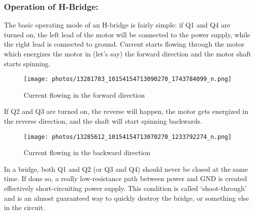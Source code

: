 \subsubsection*{Operation of H-Bridge:}
The basic operating mode of an H-bridge is fairly simple: if Q1 and Q4 are turned on, the left lead of the motor will be connected to the power supply, while the right lead is connected to ground. Current starts flowing through the motor which energizes the motor in (let’s say) the forward direction and the motor shaft starts spinning.
\begin{figure}[h]
\center
\texttt{[image: photos/13281783\_10154154713090270\_1743784099\_n.png]} 
\caption{Current flowing in the forward direction}
\end{figure}
\justify
If Q2 and Q3 are turned on, the reverse will happen, the motor gets energized in the reverse direction, and the shaft will start spinning backwards.\\
\newpage
\begin{figure}[h]
\center
\texttt{[image: photos/13285612\_10154154713070270\_1233792274\_n.png]} 
\caption{Current flowing in the backward direction}
\end{figure}
\justify
In a bridge, both Q1 and Q2 (or Q3 and Q4) should never be closed at the same time. If done so, a really low-resistance path between power and GND is created effectively short-circuiting power supply. This condition is called ‘shoot-through’ and is an almost guaranteed way to quickly destroy the bridge, or something else in the circuit.\\

